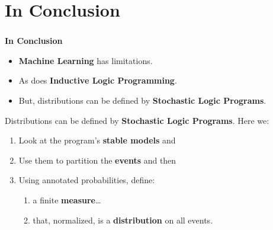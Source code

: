 \documentclass[bigger]{beamer}
\begin{document}
\section{In Conclusion}
%
%
\begin{frame}
    \frametitle{}
    \vfill
    \begin{center}
        {\huge\bf In Conclusion}
    \end{center}
    \vfill
\end{frame}
%
\begin{frame}
    \begin{itemize}
        \item \textbf{Machine Learning} has limitations.
        \item As does \textbf{Inductive Logic Programming}.
        \item But, distributions can be defined by \textbf{Stochastic Logic Programs}.
    \end{itemize}
\end{frame}
%
\begin{frame}
    Distributions can be defined by \textbf{Stochastic Logic Programs}. Here we:
    \begin{enumerate}
        \item Look at the program's \textbf{stable models} and
        \item Use them to partition the \textbf{events} and then
        \item Using annotated probabilities, define:
        \begin{enumerate}
            \item a finite \textbf{measure}\ldots
            \item that, normalized, is a  \textbf{distribution} on all events.
        \end{enumerate}
    \end{enumerate}
\end{frame}
\end{document}
